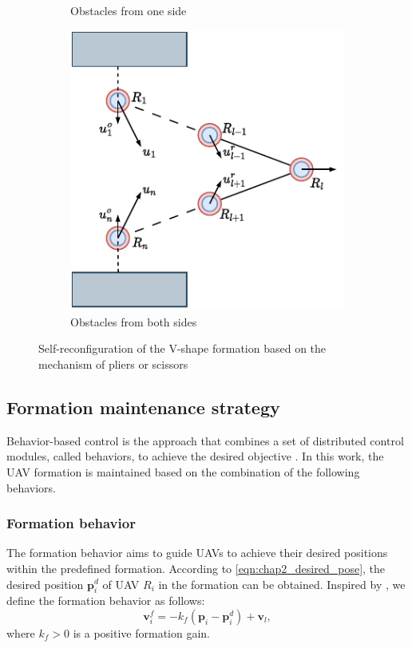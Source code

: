 \begin{figure}
\begin{subfigure}[b]{0.32\textwidth}
    \caption{Obstacles from one side}
    \label{fig:chap2_reconfig1}
    \end{subfigure}
    \begin{subfigure}[b]{0.32\textwidth}
    \includegraphics[width=\textwidth]{paper1/images/reconfiguration2.pdf}
    \caption{Obstacles from both sides}
    \label{fig:chap2_reconfig2}
    \end{subfigure}
    \caption{Self-reconfiguration of the V-shape formation based on the mechanism of pliers or scissors}
    \label{fig:chap2_reconfiguration}
\end{figure}

\subsection{Formation maintenance strategy}
Behavior-based control is the approach that combines a set of distributed control modules, called behaviors, to achieve the desired objective \cite{Mataric2008, 736776}. In this work, the UAV formation is maintained based on the combination of the following behaviors.
\subsubsection{Formation behavior}
The formation behavior aims to guide UAVs to achieve their desired positions within the predefined formation. According to \eqref{eqn:chap2_desired_pose}, the desired position $\mathbf{p}_i^d$ of UAV $R_i$ in the formation can be obtained. Inspired by \cite{Dang2019,MirzaeeKahagh2020}, we define the formation behavior as follows:
\begin{equation}
    \mathbf{v}_i^f=-k_f\left(\mathbf{p}_i- \mathbf{p}_i^d\right) + \mathbf{v}_l,
    \label{eqn:chap2_uf}
\end{equation}
where $k_f>0$ is a positive formation gain. 

